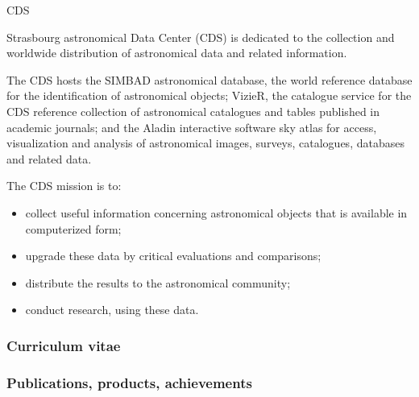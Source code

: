 \begin{sitedescription}{CDS}

Strasbourg astronomical Data Center (CDS) is dedicated to the collection and worldwide distribution of astronomical data and related information.

The CDS hosts the SIMBAD astronomical database, the world reference database for the identification of astronomical objects; VizieR, the catalogue service for the CDS reference collection of astronomical catalogues and tables published in academic journals; and the Aladin interactive software sky atlas for access, visualization and analysis of astronomical images, surveys, catalogues, databases and related data.

The CDS mission is to:

\begin{itemize}
  \item collect useful information concerning astronomical objects that is available in computerized form;
  \item upgrade these data by critical evaluations and comparisons;
  \item distribute the results to the astronomical community;
  \item conduct research, using these data.
\end{itemize}

%

\subsubsection*{Curriculum vitae}


%
%




\subsubsection*{Publications, products, achievements}


\end{sitedescription}
